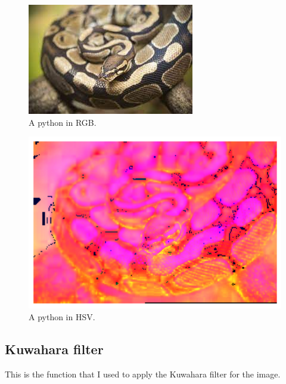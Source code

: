 \documentclass{article}
\begin{document}
	\begin{figure}
		\includegraphics[width=\linewidth]{python.jpg}
		\caption{A python in RGB.}
		\label{fig:python}
	\end{figure}
	
	\begin{figure}
		\includegraphics[width=\linewidth]{hsv_image.png}
		\caption{A python in HSV.}
		\label{fig:hsv_python}
	\end{figure}
	
	\subsection{Kuwahara filter}
	
	This is the function that I used to apply the Kuwahara filter for the image.
	
\end{document}
